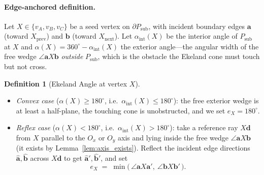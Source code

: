 \documentclass[10pt]{article}
\theoremstyle{plain}
\theoremstyle{definition}
\newtheorem{definition}[theorem]{Definition}
\begin{document}
\paragraph{Edge-anchored definition.}
Let $X \in \{v_A,v_B,v_C\}$ be a seed vertex on $\partial P_{\mathrm{sub}}$, with
incident boundary edges $\mathbf{a}$ (toward $X_{\mathrm{prev}}$) and $\mathbf{b}$
(toward $X_{\mathrm{next}}$). Let $\alpha_{\mathrm{int}}(X)$ be the interior angle
of $P_{\mathrm{sub}}$ at $X$ and $\alpha(X)=360^\circ-\alpha_{\mathrm{int}}(X)$
the exterior angle---the angular width of the free wedge $\angle\mathbf{a}X\mathbf{b}$
\emph{outside} $P_{\mathrm{sub}}$, which is the obstacle the Ekeland cone must
touch but not cross.

\begin{definition}[Ekeland Angle at vertex $X$]
\label{def:ekeland_angle}
\leavevmode
\begin{itemize}[leftmargin=*,topsep=2pt]
\item \emph{Convex case} ($\alpha(X)\ge180^\circ$, i.e.\ $\alpha_{\mathrm{int}}(X)\le180^\circ$):
      the free exterior wedge is at least a half-plane, the touching cone is
      unobstructed, and we set $e_X = 180^\circ$.
\item \emph{Reflex case} ($\alpha(X)<180^\circ$, i.e.\ $\alpha_{\mathrm{int}}(X)>180^\circ$):
      take a reference ray $X\mathbf{d}$ from $X$ parallel to the $O_x$ or $O_y$
      axis and lying inside the free wedge $\angle\mathbf{a}X\mathbf{b}$ (it
      exists by Lemma~\ref{lem:axis_exists}). Reflect the incident edge
      directions $\hat{\mathbf{a}},\hat{\mathbf{b}}$ across $X\mathbf{d}$ to get
      $\hat{\mathbf{a}}',\hat{\mathbf{b}}'$, and set
      \begin{equation}
        e_X \;=\; \min\bigl(\,\angle\mathbf{a}X\mathbf{a}',\ \angle\mathbf{b}X\mathbf{b}'\,\bigr).
        \label{eq:ekeland_angle}
      \end{equation}
\end{itemize}
\end{definition}
\end{document}
